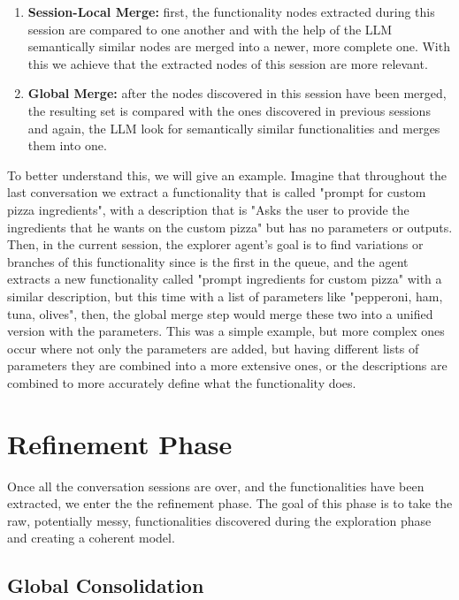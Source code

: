 \begin{enumerate}
  \item \textbf{Session-Local Merge:}
    first, the functionality nodes extracted during this session
    are compared to one another and with the help of the \ac{LLM}
    semantically similar nodes are merged into a newer, more complete one.
    With this we achieve that the extracted nodes of this session are more relevant.

  \item \textbf{Global Merge:}
    after the nodes discovered in this session have been merged,
    the resulting set is compared with the ones discovered in previous sessions
    and again, the \ac{LLM} look for semantically similar functionalities
    and merges them into one.
\end{enumerate}

To better understand this, we will give an example.
Imagine that throughout the last conversation
we extract a functionality that is called
"prompt for custom pizza ingredients",
with a description that is
"Asks the user to provide the ingredients that he wants on the custom pizza"
but has no parameters or outputs.
Then, in the current session,
the explorer agent's goal is
to find variations or branches of this functionality since is the first in the queue,
and the agent extracts a new functionality called
"prompt ingredients for custom pizza"
with a similar description,
but this time with a list of parameters like
"pepperoni, ham, tuna, olives",
then, the global merge step would merge these two
into a unified version with the parameters.
This was a simple example,
but more complex ones occur where
not only the parameters are added,
but having different lists of parameters they are combined into a more extensive ones,
or the descriptions are combined
to more accurately define what the functionality does.



\section{Refinement Phase}\label{sec:refinement}


Once all the conversation sessions are over,
and the functionalities have been extracted,
we enter the the refinement phase.
The goal of this phase is to take the raw, potentially messy,
functionalities discovered during the exploration phase
and creating a coherent model.

\subsection{Global Consolidation}

